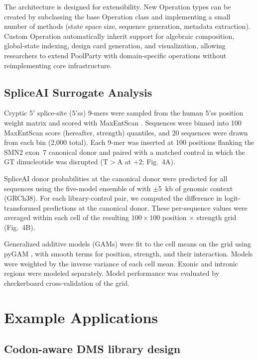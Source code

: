 \documentclass[unnumsec,webpdf,modern,large]{mam-authoring-template}%
\theoremstyle{thmstyleone}%
\theoremstyle{thmstyletwo}%
\theoremstyle{thmstylethree}%
\begin{document}
The architecture is designed for extensibility. New Operation types can be created by subclassing the base Operation class and implementing a small number of methods (state space size, sequence generation, metadata extraction). Custom Operation automatically inherit support for algebraic composition, global-state indexing, design card generation, and visualization, allowing researchers to extend PoolParty with domain-specific operations without reimplementing core infrastructure.

\subsection{SpliceAI Surrogate Analysis}

Cryptic 5$'$ splice-site (5$'$ss) 9-mers were sampled from the human 5$'$ss position weight matrix \citep{Wong2018quantitative} and scored with MaxEntScan \citep{Yeo2004me}. Sequences were binned into 100 MaxEntScan score (hereafter, strength) quantiles, and 20 sequences were drawn from each bin (2,000 total). Each 9-mer was inserted at 100 positions flanking the SMN2 exon~7 canonical donor and paired with a matched control in which the GT dinucleotide was disrupted (T$>$A at $+2$; Fig.~4A).

SpliceAI donor probabilities at the canonical donor were predicted for all sequences using the five-model ensemble of \citet{Jaganathan2019ps} with $\pm$5~kb of genomic context (GRCh38). For each library-control pair, we computed the difference in logit-transformed predictions at the canonical donor. These per-sequence values were averaged within each cell of the resulting $100 \times 100$ position $\times$ strength grid (Fig.~4B).

Generalized additive models (GAMs) were fit to the cell means on the grid using pyGAM \citep{Serven2018pg}, with smooth terms for position, strength, and their interaction. Models were weighted by the inverse variance of each cell mean. Exonic and intronic regions were modeled separately. Model performance was evaluated by checkerboard cross-validation of the grid.


\section{Example Applications}

\subsection{Codon-aware DMS library design}
\end{document}

